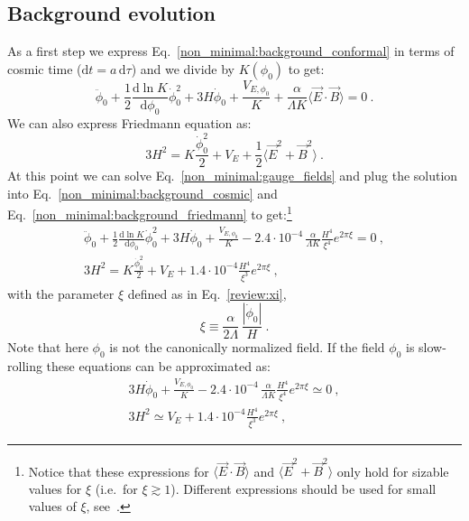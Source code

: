 \subsection{Background evolution}
\label{sec:background}
As a first step we express Eq.~\eqref{non_minimal:background_conformal} in terms of cosmic time ($\textrm{d}t = a \, \textrm{d}\tau$) and we divide by $K(\phi_0)$ to get:
\begin{equation}
	\label{non_minimal:background_cosmic}
	\ddot{\phi}_0 + \frac{1}{2} \frac{\textrm{d} \ln K}{\textrm{d} \phi_0} \dot{\phi}_0^2 + 3 H \dot{\phi}_0 + \frac{V_{E,\phi_0}}{K} + \frac{\alpha}{\Lambda K} \langle \vec{E}\cdot \vec{B}\rangle = 0 \ .
\end{equation}
We can also express Friedmann equation as:
\begin{equation}
	\label{non_minimal:background_friedmann}
	3 H^2 = K \frac{\dot{\phi}_0^2}{2} + V_E + \frac{1}{2} \langle \vec{E}^2 + \vec{B}^2 \rangle \ .
\end{equation}
At this point we can solve Eq.~\eqref{non_minimal:gauge_fields} and plug the solution into Eq.~\eqref{non_minimal:background_cosmic} and Eq.~\eqref{non_minimal:background_friedmann} to get:\footnote{Notice that these expressions for $\langle \vec{E}\cdot \vec{B}\rangle$ and $\langle \vec{E}^2 + \vec{B}^2 \rangle$ only hold for sizable values for $\xi$ (i.e.\ for $\xi \gtrsim 1$). Different expressions should be used for small values of $\xi$, see~\cite{Anber:2009ua}.}
\begin{eqnarray}
	\label{non_minimal:background_scalar}
	\ddot{\phi}_0 + \frac{1}{2} \frac{\textrm{d} \ln K}{\textrm{d} \phi_0} \dot{\phi}_0^2 + 3 H \dot{\phi}_0 + \frac{V_{E,\phi_0}}{K} - 2.4 \cdot 10^{-4} \, \frac{\alpha}{\Lambda K} \frac{H^4}{\xi^4} e^{2 \pi \xi} = 0 \ , \\
	\label{non_minimal:background_friedmann_2}
	3 H^2 = K \frac{\dot{\phi}_0^2}{2} + V_E + 1.4 \cdot 10^{-4} \frac{H^4}{\xi^3} e^{2 \pi \xi}	 \ ,
\end{eqnarray}
with the parameter $\xi$ defined as in Eq.~\eqref{review:xi},
\begin{equation}
	\label{non_minimal:xi_def}
	\xi \equiv \frac{\alpha}{2 \Lambda} \, \frac{|\dot{\phi}_0|}{H} \ .
\end{equation}
Note that here $\phi_0$ is not the canonically normalized field. If the field $\phi_0$ is slow-rolling these equations can be approximated as:
\begin{eqnarray}
	\label{non_minimal:slow_roll_gauge}
	 3 H \dot{\phi}_0 + \frac{V_{E,\phi_0}}{K} - 2.4 \cdot 10^{-4} \, \frac{\alpha}{\Lambda K} \frac{H^4}{\xi^4} e^{2 \pi \xi} \simeq 0 \ , \\
	 	\label{non_minimal:slow_roll_friedmann}
	3 H^2 \simeq V_E + 1.4 \cdot 10^{-4} \frac{H^4}{\xi^3} e^{2 \pi \xi} \ ,
\end{eqnarray}
